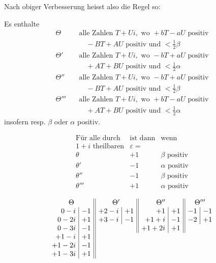 Nach obiger Verbesserung heisst also die Regel so:\par
Es enthalte
\[
\begin{aligned}
\Theta\quad&\text{alle Zahlen }T+Ui,\text{ wo }+bT-aU\text{ positiv}\\
&\quad -BT+AU\text{ positiv und }<\tfrac12\beta\\
\Theta'\quad&\text{alle Zahlen }T+Ui,\text{ wo }-bT+aU\text{ positiv}\\
&\quad +AT+BU\text{ positiv und }<\tfrac12\alpha\\
\Theta''\quad&\text{alle Zahlen }T+Ui,\text{ wo }-bT+aU\text{ positiv}\\
&\quad -BT+AU\text{ positiv und }<\tfrac12\beta\\
\Theta'''\quad&\text{alle Zahlen }T+Ui,\text{ wo }+bT-aU\text{ positiv}\\
&\quad +AT+BU\text{ positiv und }<\tfrac12\alpha
\end{aligned}
\]
insofern resp. $\beta$ oder $\alpha$ positiv.

%
\[
\begin{array}{c|c|l}
\text{Für alle durch}&\text{ist dann}&\text{wenn}\\
1+i\text{ theilbaren}&\varepsilon=&\\
\theta&+1&\beta\text{ positiv}\\
\theta'&-1&\alpha\text{ positiv}\\
\theta''&-1&\beta\text{ positiv}\\
\theta'''&+1&\alpha\text{ positiv}
\end{array}
\]

\[
\setlength{\arraycolsep}{4pt}
\begin{array}{r|r||r|r||r|r||r|r}
\multicolumn{2}{c||}{\Theta}&\multicolumn{2}{c||}{\Theta'}&\multicolumn{2}{c||}{\Theta''}&\multicolumn{2}{c}{\Theta'''}\\
0-i&-1&+2-i&+1&+1&+1&-1&-1\\
0-2i&+1&+3-i&-1&+1+i&-1&-2&+1\\
0-3i&-1&\multicolumn{2}{c||}{}&+1+2i&+1&\multicolumn{2}{c}{}\\
+1-i&+1&\multicolumn{6}{c}{}\\
+1-2i&-1&\multicolumn{6}{c}{}\\
+1-3i&+1&\multicolumn{6}{c}{}
\end{array}
\]

\begin{center}
\resizebox{.86\textwidth}{!}{}
\end{center}

